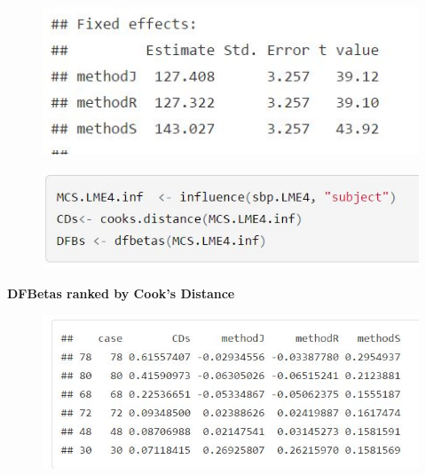 \documentclass[compress]{beamer}        %
\begin{document}
\begin{frame}
\begin{figure}
\centering
\includegraphics[width=0.8\linewidth]{images/InfluenceOutput1}

\end{figure}

\end{frame}
\begin{frame}
	\begin{figure}
\centering
\includegraphics[width=0.99\linewidth]{images/influenceCode1}
\end{figure}

\end{frame}
\begin{frame}
\large \noindent \textbf{DFBetas ranked by Cook's Distance}
	\begin{figure}
\centering
\includegraphics[width=0.99\linewidth]{images/InfluenceOutput2}
\end{figure}

\end{frame}
\end{document}
